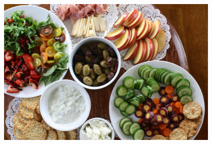 \begin{myquote}







\begin{figure}[H]
\centering
\includegraphics[width=0.95\textwidth]{./imgSAEB_7_POR/media/image69.png}
\end{figure} 


\end{myquote}
